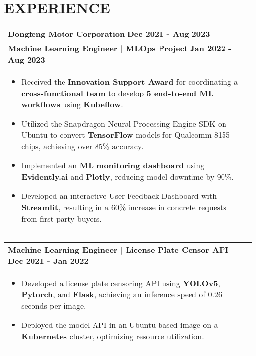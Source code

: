 \documentclass[a4paper,8pt]{article}
\begin{document}
\section{\textbf{EXPERIENCE}}
\begin{tabularx}{\linewidth}{ @{}l r@{} }
\textbf{Dongfeng Motor Corporation} \hfill \textbf{Dec 2021 - Aug 2023} \\[3pt]
\textbf{Machine Learning Engineer | MLOps Project} \hfill \textbf{Jan 2022 - Aug 2023} \\[0.5pt]
\begin{minipage}[t]{\linewidth}
    \begin{itemize}[nosep,after=\strut, leftmargin=1em, itemsep=0.3pt]
        \item Received the \textbf{Innovation Support Award} for coordinating a \textbf{cross-functional team} to develop \textbf{5 end-to-end ML workflows} using \textbf{Kubeflow}.
        \item Utilized the Snapdragon Neural Processing Engine SDK on Ubuntu to convert \textbf{TensorFlow} models for Qualcomm 8155 chips, achieving over 85\% accuracy.
        \item Implemented an \textbf{ML monitoring dashboard} using \textbf{Evidently.ai} and \textbf{Plotly}, reducing model downtime by 90\%.
        \item Developed an interactive User Feedback Dashboard with \textbf{Streamlit}, resulting in a 60\% increase in concrete requests from first-party buyers.
    \end{itemize}
\end{minipage}
\end{tabularx}
\begin{tabularx}{\linewidth}{ @{}l r@{} }
\textbf{Machine Learning Engineer | License Plate Censor API} \hfill \textbf{Dec 2021 - Jan 2022} \\[1pt]
\begin{minipage}[t]{\linewidth}
    \begin{itemize}[nosep,after=\strut, leftmargin=1em, itemsep=2pt]
        \item Developed a license plate censoring API using \textbf{YOLOv5}, \textbf{Pytorch}, and \textbf{Flask}, achieving an inference speed of 0.26 seconds per image.
        \item Deployed the model API in an Ubuntu-based image on a \textbf{Kubernetes} cluster, optimizing resource utilization.
    \end{itemize}
\end{minipage}
\end{tabularx}
\end{document}
